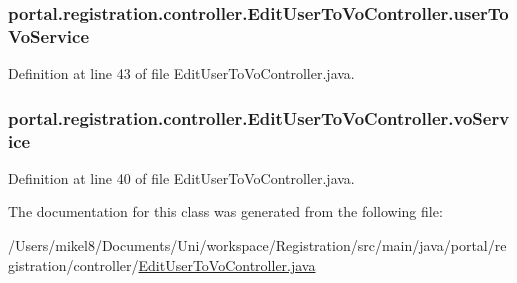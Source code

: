 \hypertarget{classportal_1_1registration_1_1controller_1_1EditUserToVoController_ab8208b9d0524717c5d5c3b7ce8cfbfd8}{
\subsubsection[{userToVoService}]{ {\bf portal.registration.controller.EditUserToVoController.userToVoService}}}
\label{classportal_1_1registration_1_1controller_1_1EditUserToVoController_ab8208b9d0524717c5d5c3b7ce8cfbfd8}


Definition at line 43 of file EditUserToVoController.java.

\hypertarget{classportal_1_1registration_1_1controller_1_1EditUserToVoController_a6b47f2cf57b93f14868b6643a7a05647}{
\subsubsection[{voService}]{ {\bf portal.registration.controller.EditUserToVoController.voService}}}
\label{classportal_1_1registration_1_1controller_1_1EditUserToVoController_a6b47f2cf57b93f14868b6643a7a05647}


Definition at line 40 of file EditUserToVoController.java.



The documentation for this class was generated from the following file:\begin{DoxyCompactItemize}
\item 
/Users/mikel8/Documents/Uni/workspace/Registration/src/main/java/portal/registration/controller/\hyperlink{EditUserToVoController_8java}{EditUserToVoController.java}\end{DoxyCompactItemize}
